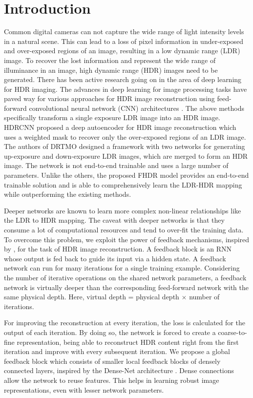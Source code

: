 \documentclass[conference]{IEEEtran}
\begin{document}
\section{Introduction}
Common digital cameras can not capture the wide range of light intensity levels in a natural scene.
This can lead to a loss of pixel information in under-exposed and over-exposed regions of an image, resulting in a low dynamic range (LDR) image. To recover the lost information and represent the wide range of illuminance in an image, high dynamic range (HDR) images need to be generated. There has been active research going on in the area of deep learning for HDR imaging. The advances in deep learning for image processing tasks have paved way for various approaches for HDR image reconstruction using feed-forward convolutional neural network (CNN) architectures \cite{eilertsen2017hdr}\cite{marnerides2018expandnet}\cite{endo2017deep}\cite{yang2018image}\cite{lee2018deep}. The above methods specifically transform a single exposure LDR image into an HDR image. 
HDRCNN \cite{eilertsen2017hdr} proposed a deep autoencoder for HDR image reconstruction which uses a weighted mask to recover only the over-exposed regions of an LDR image. The authors of DRTMO \cite{endo2017deep} designed a framework with two networks for generating up-exposure and down-exposure LDR images, which are merged to form an HDR image. The network is not end-to-end trainable and uses a large number of parameters. Unlike the others, the proposed FHDR model provides an end-to-end trainable solution and is able to comprehensively learn the LDR-HDR mapping while outperforming the existing methods.

Deeper networks are known to learn more complex non-linear relationships like the LDR to HDR mapping. The caveat with deeper networks is that they consume a lot of computational resources and tend to over-fit the training data. To overcome this problem, we 
exploit the power of feedback mechanisms, inspired by \cite{zamir2017feedback}, for the task of HDR image reconstruction. A feedback block is an RNN whose output is fed back to guide its input via a hidden state.
A feedback network can run for many iterations for a single training example. Considering the number of iterative operations on the shared network parameters, a feedback network is virtually deeper than the corresponding feed-forward network with the same physical depth. Here, virtual depth = physical depth $\times$ number of iterations.


For improving the reconstruction at every iteration, the loss is calculated for the output of each iteration.
By doing so, the network is forced to create a coarse-to-fine representation, being able to reconstruct HDR content right from the first iteration and improve with every subsequent iteration.
We propose a global feedback block which consists of smaller local feedback blocks of densely connected layers, inspired by the Dense-Net architecture \cite{huang2017densely}. Dense connections allow the network to reuse features. This helps in learning robust image representations, even with lesser network parameters. 
\end{document}
